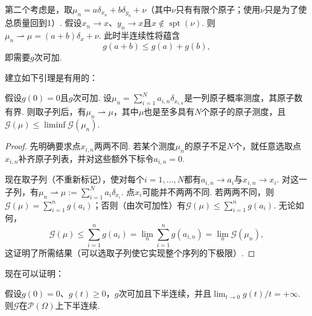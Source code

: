 第二个考虑是，取$\mu_n=a\delta_{x_n}+b\delta_{y_n}+\nu$（其中$\nu$只有有限个原子；使用$\nu$只是为了使总质量回到1）. 假设$x_n\to x$、$y_n\to x$且$x\notin\operatorname{spt}(\nu)$. 则$\mu_n\rightharpoonup\mu=(a+b)\delta_x+\nu$. 此时半连续性将蕴含
\[
 g(a+b)\leq g(a)+g(b),
\]
即需要$g$次可加.

建立如下引理是有用的：
\begin{lemma}\label{obj:7.10}
假设$g(0)=0$且$g$次可加. 设$\mu_n=\sum_{i=1}^Na_{i,n}\delta_{x_{i,n}}$是一列原子概率测度，其原子数有界. 则取子列后，有$\mu_n\rightharpoonup\mu$，其中$\mu$也是至多具有$N$个原子的原子测度，且$\mathscr G(\mu)\leq\liminf\mathscr G(\mu_n)$.
\end{lemma}
\begin{proof}
先明确要求点$x_{i,n}$两两不同. 若某个测度$\mu_n$的原子不足$N$个，就任意选取点$x_{i,n}$补齐原子列表，并对这些额外下标令$a_{i,n}=0$.

现在取子列（不重新标记），使对每个$i=1,\ldots,N$都有$a_{i,n}\to a_i$与$x_{i,n}\to x_i$. 对这一子列，有$\mu_n\rightharpoonup\mu:=\sum_{i=1}^Na_i\delta_{x_i}$. 点$x_i$可能并不两两不同. 若两两不同，则$\mathscr G(\mu)=\sum_{i=1}^ng(a_i)$；否则（由次可加性）有$\mathscr G(\mu)\leq\sum_{i=1}^ng(a_i)$. 无论如何，
\[
 \mathscr G(\mu)\leq\sum_{i=1}^ng(a_i)
 =\lim_n\sum_{i=1}^ng(a_{i,n})=\lim_n\mathscr G(\mu_n),
\]
这证明了所需结果（可以选取子列使它实现整个序列的下极限）.
\end{proof}
现在可以证明：
\begin{lemma}\label{obj:7.11}
假设$g(0)=0$、$g(t)\geq0$，$g$次可加且下半连续，并且$\lim_{t\to0}g(t)/t=+\infty$. 则$\mathscr G$在$\mathscr P(\Omega)$上下半连续.
\end{lemma}
